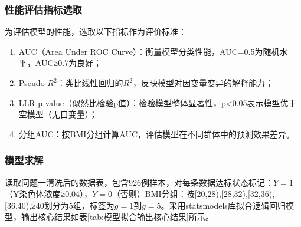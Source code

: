 \documentclass[withoutpreface,bwprint]{cumcmthesis} %
\begin{document}
\subsubsection{性能评估指标选取}
为评估模型的性能，选取以下指标作为评价标准：
\begin{enumerate}
    \item AUC（Area Under ROC Curve）：衡量模型分类性能，AUC=0.5为随机水平，AUC≥0.7为良好；
    \item Pseudo $R^2$：类比线性回归的$R^2$，反映模型对因变量变异的解释能力；
    \item LLR p-value（似然比检验p值）：检验模型整体显著性，p<0.05表示模型优于空模型（无自变量）；
    \item 分组AUC：按BMI分组计算AUC，评估模型在不同群体中的预测效果差异。
\end{enumerate}
  

\subsubsection{模型求解}  
读取问题一清洗后的数据表，包含926例样本，对每条数据达标状态标记：$Y=1$（Y染色体浓度≥0.04），$Y=0$（否则）BMI分组：按[20,28),[28,32),[32,36),[36,40),≥40划分为5组，标签为$g=1$到$g=5$。采用statsmodels库拟合逻辑回归模型，输出核心结果如表\ref{tab:模型拟合输出核心结果}所示。
\end{document}
